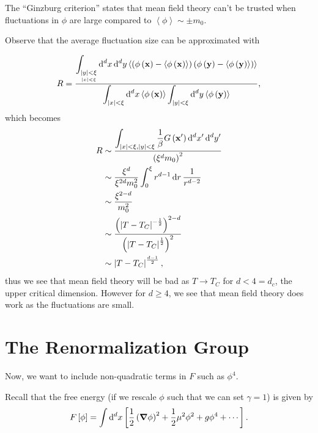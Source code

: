 
The ``Ginzburg criterion'' states that mean field theory can't be trusted when fluctuations in $\phi $ are large compared to $\left<\phi  \right> \sim  \pm m_0$.

Observe that the average fluctuation size can be approximated with

\begin{align}
R = \frac{\displaystyle\int_{\underset{\left| x \right| < \xi}{\left| y \right| < \xi}} \dd{^{d}x} \dd{^{d}y} \left< \left( \phi \left( \vb{x} \right)  - \left<\phi \left( \vb{x} \right)  \right> \right) \left( \phi \left( \vb{y} \right) - \left<\phi \left( \vb{y} \right)  \right> \right)  \right>}{\displaystyle\int_{\left| x \right| < \xi} \dd{^{d}x} \left<\phi \left( \vb{x} \right)  \right>\int_{\left| y \right| < \xi} \dd{^{d}y} \left<\phi \left( \vb{y} \right)  \right>} 
,\end{align}
which becomes
\begin{align}
    R &\sim  \frac{\displaystyle\int_{\left| x \right| < \xi, \left| y \right| < \xi} \frac{1}{\beta} G\left( \vb{x}' \right) \dd{^{d}x'} \dd{^{d}y'}}{\left( \xi^{d}m_0 \right)^2} \\
    &\sim  \frac{\xi^{d}}{\xi^{2d} m_0^2} \int_0^{\xi} r^{d-1} \dd{r} \frac{1}{r^{d-2}} \\
    &\sim  \frac{\xi^{2-d}}{m_0^2} \\
    &\sim  \frac{\left( \left|  T - T_C \right|^{-\frac{1}{2}} \right)^{2-d} }{\left( \left| T - T_C \right|^{\frac{1}{2}} \right)^{2}} \\
    &\sim  \left| T - T_C \right|^{\frac{d-1}{2}}
,\end{align}
thus we see that mean field theory will be bad as $T \to T_C$ for $d < 4 = d_c$, the upper critical dimension. However for $d \geq 4$, we see that mean field theory does work as the fluctuations are small.


\section{The Renormalization Group}

Now, we want to include non-quadratic terms in $F$ such as $\phi^{4}$.

Recall that the free energy (if we rescale $\phi$ such that we can set $\gamma = 1$) is given by
\begin{align}
    F \left[ \phi \right] = \int \dd{^{d}x} \left[ \frac{1}{2} \left( \grad \phi \right)^2 + \frac{1}{2}\mu^2 \phi^2 + g \phi^{4} + \cdots \right] 
.\end{align}

